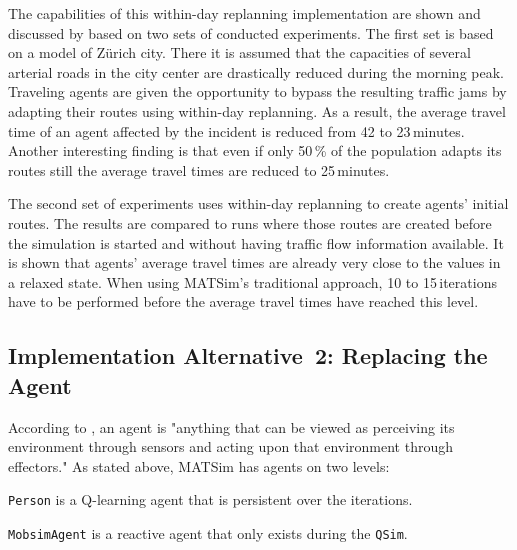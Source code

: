 The capabilities of this within-day replanning implementation are shown and discussed by \citet{Dobler_PhDThesis_2013} based on two sets of conducted experiments. The first set is based on a model of Zürich city. There it is assumed that the capacities of several arterial roads in the city center are drastically reduced during the morning peak. Traveling agents are given the opportunity to bypass the resulting traffic jams by adapting their routes using within-day replanning. As a result, the average travel time of an agent affected by the incident is reduced from 42 to 23\,minutes. Another interesting finding is that even if only 50\,\% of the population adapts its routes still the average travel times are reduced to 25\,minutes.

The second set of experiments uses within-day replanning to create agents' initial routes. The results are compared to runs where those routes are created before the simulation is started and without having traffic flow information available. It is shown that agents' average travel times are already very close to the values in a relaxed state. When using MATSim's traditional approach, 10 to 15\,iterations have to be performed before the average travel times have reached this level. %

\subsection{Implementation Alternative~2: Replacing the Agent}
\label{sec:impl-repl-the-ag}

According to \cite{RussellNorvigBook}, an agent is "anything that can be viewed as perceiving its environment through sensors and acting upon that environment through effectors."  As stated above, MATSim has agents on two levels:
\begin{compactitem}

\item \lstinline$Person$ is a Q-learning agent that is persistent over the iterations.

\item \lstinline$MobsimAgent$ is a reactive agent that only exists during the \lstinline$QSim$.

\end{compactitem}

